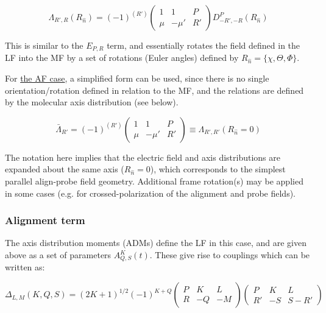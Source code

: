 \documentclass[10pt]{article}
\begin{document}
\begin{equation}
\Lambda_{R',R}(R_{\hat{n}})=(-1)^{(R')}\left(\begin{array}{ccc}
1 & 1 & P\\
\mu & -\mu' & R'
\end{array}\right)D_{-R',-R}^{P}(R_{\hat{n}})
\label{eq:lambda-func-defn-MF}
\end{equation}

This is similar to the $E_{P,R}$ term, and essentially rotates the field defined in the LF into
the MF by a set of rotations (Euler angles) defined by $R_{\hat{n}}=\{\chi,\Theta,\Phi\}$.

For
\href{https://epsproc.readthedocs.io/en/latest/methods/geometric_method_dev_pt3_AFBLM_090620_010920_dev_bk100920.html\#/beta_\%7BL,M\%7D\%5E\%7BAF\%7D-rewrite}{the
AF case}, a simplified form can be used, since there is no single
orientation/rotation defined in relation to the MF, and the relations are defined by the
molecular axis distribution (see below). 

\begin{equation}
\bar{\Lambda}_{R'}=(-1)^{(R')}\left(\begin{array}{ccc}
1 & 1 & P\\
\mu & -\mu' & R'
\end{array}\right)\equiv\Lambda_{R',R'}(R_{\hat{n}}=0)
\label{eq:lambda-func-defn-AF}
\end{equation}

The notation here implies that the electric field and axis distributions are expanded about the same axis ($R_{\hat{n}}=0$), which corresponds to the simplest parallel align-probe field geometry. Additional frame rotation(s) may be applied in some cases (e.g. for crossed-polarization of the alignment and probe fields).

\subsubsection{Alignment term\label{alignment-term}}

The axis distribution moments (ADMs) define the LF in this case, and are given above as a set of parameters $A_{Q,S}^{K}(t)$. These give rise to couplings which can be written as:

\begin{equation}
\Delta_{L,M}(K,Q,S)=(2K+1)^{1/2}(-1)^{K+Q}\left(\begin{array}{ccc}
P & K & L\\
R & -Q & -M
\end{array}\right)\left(\begin{array}{ccc}
P & K & L\\
R' & -S & S-R'
\end{array}\right)
\label{eq:delta-func-defn}
\end{equation}
\end{document}
